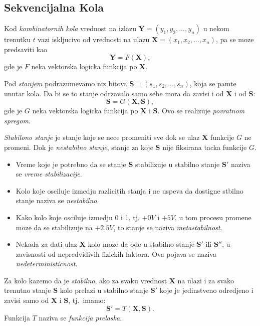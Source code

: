 \documentclass[12p,a4paper]{article}
\begin{document}
\begin{multicols}{2}
    \section{Sekvencijalna Kola}

    Kod \emph{kombinatornih kola} vrednost na izlazu 
    $\mathbf{Y} = (y_1, y_2, \ldots, y_n)$ u nekom trenutku $t$ vazi 
    iskljucivo od vrednosti na ulazu $\mathbf{X} = (x_1, x_2, \ldots, x_n)$, 
    pa se moze predsaviti kao
    \[
        \mathbf{Y} = F(\mathbf{X}),
    \]
    gde je $F$ neka vektorska logicka funkcija po $\mathbf{X}$.

    Pod \emph{stanjem} podrazumevamo niz bitova 
    $\mathbf{S} = (s_1, s_2, \ldots, s_n)$, koja se pamte unutar kola.
    Da bi se to stanje odrzavalo samo sebe mora da zavisi i od $\mathbf{X}$ i 
    od $\mathbf{S}$:
    \[
        \mathbf{S} = G(\mathbf{X}, \mathbf{S}),
    \]
    gde je $G$ neka vektorska logicka funkcija po $\mathbf{X}$ i $\mathbf{S}$.
    Ovo se realizuje \emph{povratnom spregom}.
    
    \emph{Stabilono stanje} je stanje koje se nece promeniti sve dok se ulaz
    $\mathbf{X}$ funkcije $G$ ne promeni. Dok je \emph{nestabilno stanje}, 
    stanje za koje $\mathbf{S}$ nije fiksirana tacka funkcije $G$.

    \begin{itemize}
        \itemsep0em
        \item Vreme koje je potrebno da se stanje $\mathbf{S}$ stabilizuje u
              stabilno stanje $\mathbf{S'}$ naziva se 
              \emph{vreme stabilizacije}.
        \item Kolo koje osciluje izmedju razlicitih stanja i ne uspeva da 
              dostigne stbilno stanje naziva se \emph{nestabilno}.
        \item Kako kolo koje osciluje izmedju 0 i 1, tj. $+0V$ i $+5V$, u tom
              procesu promene moze da se stabilizuje na $+2.5V$, to stanje
              se naziva \emph{metastabilnost}.
        \item Nekada za dati ulaz $\mathbf{X}$ kolo moze da ode u stabilno 
              stanje $\mathbf{S'}$ ili $\mathbf{S''}$, u zavisnosti od 
              nepredvidivih fizickih faktora. Ova pojava se naziva 
              \emph{nedeterministicnost}.
    \end{itemize}

    Za kolo kazemo da je \emph{stabilno}, ako za svaku vrednost $\mathbf{X}$ 
    na ulazi i za svako trenutno stanje $\mathbf{S}$ kolo prelazi u stabilno
    stanje $\mathbf{S'}$ koje je jedinstveno odredjeno i zavisi samo od 
    $\mathbf{X}$ i $\mathbf{S}$, tj.\ imamo:
    \[
        \mathbf{S'} = T(\mathbf{X}, \mathbf{S}).
    \]
    Funkcija $T$ naziva se \emph{funkcija prelaska}.


\end{multicols}
\end{document}
